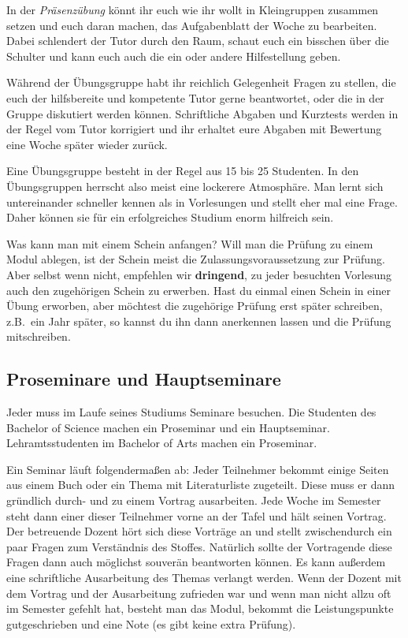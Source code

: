 In der {\it Präsenzübung} könnt ihr euch wie ihr wollt
in Kleingruppen zusammen setzen und euch daran machen,
das Aufgabenblatt der Woche zu bearbeiten.
Dabei schlendert der Tutor durch den Raum,
schaut euch ein bisschen über die Schulter
und kann euch auch die ein oder andere Hilfestellung geben.

Während der Übungsgruppe habt ihr reichlich Gelegenheit
Fragen zu stellen, die euch der hilfsbereite
und kompetente Tutor gerne beantwortet,
oder die in der Gruppe diskutiert werden können.
Schriftliche Abgaben und Kurztests werden in der Regel
vom Tutor korrigiert und ihr erhaltet eure Abgaben
mit Bewertung eine Woche später wieder zurück.

Eine Übungsgruppe besteht in der Regel aus 15 bis 25 Studenten.
In den Übungsgruppen herrscht also meist eine lockerere Atmosphäre.
Man lernt sich untereinander schneller kennen
als in Vorlesungen und stellt eher mal eine Frage.
Daher können sie für ein erfolgreiches Studium enorm hilfreich sein.

Was kann man mit einem Schein anfangen?
Will man die Prüfung zu einem Modul ablegen,
ist der Schein meist die Zulassungsvoraussetzung zur Prüfung.
Aber selbst wenn nicht, empfehlen wir {\bf dringend},
zu jeder besuchten Vorlesung auch den zugehörigen Schein zu erwerben.
Hast du einmal einen Schein in einer Übung erworben,
aber möchtest die zugehörige Prüfung erst später schreiben,
z.B.\ ein Jahr später, so kannst du ihn dann anerkennen lassen
und die Prüfung mitschreiben.

\subsection{Proseminare und Hauptseminare}
\label{Proseminar}
Jeder muss im Laufe seines Studiums Seminare besuchen.
Die Studenten des Bachelor of Science
machen ein Proseminar und ein Hauptseminar. 
Lehramtsstudenten im Bachelor of Arts
machen ein Proseminar.

Ein Seminar läuft folgendermaßen ab:
Jeder Teilnehmer bekommt einige Seiten
aus einem Buch oder ein Thema mit Literaturliste zugeteilt.
Diese muss er dann gründlich durch- und zu einem Vortrag ausarbeiten.
Jede Woche im Semester steht dann einer dieser Teilnehmer
vorne an der Tafel und hält seinen Vortrag.
Der betreuende Dozent hört sich diese Vorträge
an und stellt zwischendurch ein paar Fragen
zum Verständnis des Stoffes.
Natürlich sollte der Vortragende diese Fragen
dann auch möglichst souverän beantworten können.
Es kann außerdem eine schriftliche Ausarbeitung
des Themas verlangt werden. 
Wenn der Dozent mit dem Vortrag
und der Ausarbeitung zufrieden war und wenn man nicht
allzu oft im Semester gefehlt hat,
besteht man das Modul, bekommt die Leistungspunkte gutgeschrieben
und eine Note (es gibt keine extra Prüfung).

